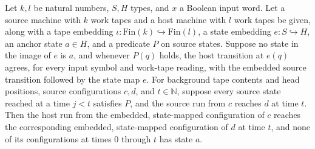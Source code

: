 \begin{lemma}
\label{Turing.FinTM.emitterP2_phase}
\leanok
{}
Let $k,l$ be natural numbers, $S,H$ types, and $x$ a Boolean input word. Let a source
machine with $k$ work tapes and a host machine with $l$ work tapes be given, along with
a tape embedding $\iota:\text{Fin}(k)\hookrightarrow\text{Fin}(l)$, a state embedding
$e:S\hookrightarrow H$, an anchor state $a\in H$, and a predicate $P$ on source states.
Suppose no state in the image of $e$ is $a$, and whenever $P(q)$ holds, the host
transition at $e(q)$ agrees, for every input symbol and work-tape reading, with the
embedded source transition followed by the state map $e$. For background tape contents
and head positions, source configurations $c,d$, and $t\in\mathbb{N}$, suppose every
source state reached at a time $j<t$ satisfies $P$, and the source run from $c$ reaches
$d$ at time $t$. Then the host run from the embedded, state-mapped configuration of $c$
reaches the corresponding embedded, state-mapped configuration of $d$ at time $t$, and
none of its configurations at times $0$ through $t$ has state $a$.
\end{lemma}

